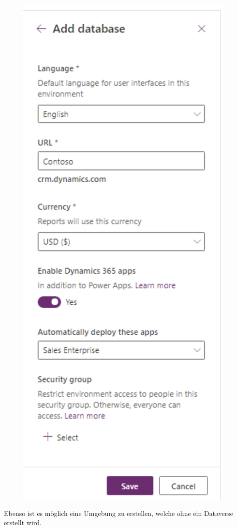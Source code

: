 \begin{figure}[H]
	\centering
	\includegraphics[scale = 0.3]{attachment/chapter_13/Scc019}
\end{figure}
Ebenso ist es möglich eine Umgebung zu erstellen, welche ohne ein Dataverse erstellt wird.

